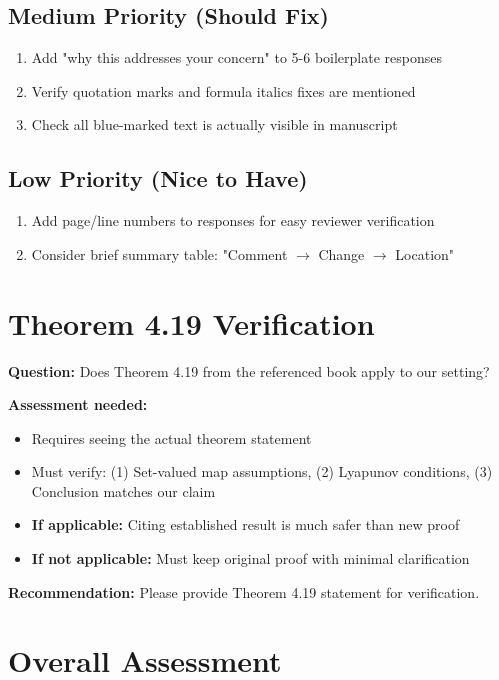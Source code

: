 \documentclass[11pt]{article}
\begin{document}
\subsection{Medium Priority (Should Fix)}

\begin{enumerate}
\item Add "why this addresses your concern" to 5-6 boilerplate responses
\item Verify quotation marks and formula italics fixes are mentioned
\item Check all blue-marked text is actually visible in manuscript
\end{enumerate}

\subsection{Low Priority (Nice to Have)}

\begin{enumerate}
\item Add page/line numbers to responses for easy reviewer verification
\item Consider brief summary table: "Comment $\rightarrow$ Change $\rightarrow$ Location"
\end{enumerate}

\section{Theorem 4.19 Verification}

\textbf{Question:} Does Theorem 4.19 from the referenced book apply to our setting?

\textbf{Assessment needed:}
\begin{itemize}
\item Requires seeing the actual theorem statement
\item Must verify: (1) Set-valued map assumptions, (2) Lyapunov conditions, (3) Conclusion matches our claim
\item \textbf{If applicable:} Citing established result is much safer than new proof
\item \textbf{If not applicable:} Must keep original proof with minimal clarification
\end{itemize}

\textbf{Recommendation:} Please provide Theorem 4.19 statement for verification.

\section{Overall Assessment}
\end{document}

